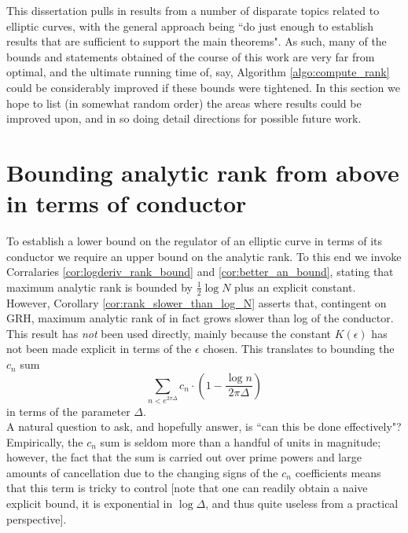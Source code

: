 
This dissertation pulls in results from a number of disparate topics related to elliptic curves, with the general approach being ``do just enough to establish results that are sufficient to support the main theorems". As such, many of the bounds and statements obtained of the course of this work are very far from optimal, and the ultimate running time of, say, Algorithm \ref{algo:compute_rank} could be considerably improved if these bounds were tightened. In this section we hope to list (in somewhat random order) the areas where results could be improved upon, and in so doing detail directions for possible future work.

\section{Bounding analytic rank from above in terms of conductor}

To establish a lower bound on the regulator of an elliptic curve in terms of its conductor we require an upper bound on the analytic rank. To this end we invoke Corralaries \ref{cor:logderiv_rank_bound} and \ref{cor:better_an_bound}, stating that maximum analytic rank is bounded by $\frac{1}{2}\log N$ plus an explicit constant. \\

However, Corollary \ref{cor:rank_slower_than_log_N} asserts that, contingent on GRH, maximum analytic rank of in fact grows slower than log of the conductor. This result has {\it not} been used directly, mainly because the constant $K(\epsilon)$ has not been made explicit in terms of the $\epsilon$ chosen. This translates to bounding the $c_n$ sum
\begin{equation}
\sum_{n < e^{2\pi \Delta}} c_n \cdot \left(1-\frac{\log n}{2\pi \Delta}\right)
\end{equation}
in terms of the parameter $\Delta$. \\

A natural question to ask, and hopefully answer, is ``can this be done effectively"? Empirically, the $c_n$ sum is seldom more than a handful of units in magnitude; however, the fact that the sum is carried out over prime powers and large amounts of cancellation due to the changing signs of the $c_n$ coefficients means that this term is tricky to control [note that one can readily obtain a naive explicit bound, it is exponential in $\log \Delta$, and thus quite useless from a practical perspective]. \\

